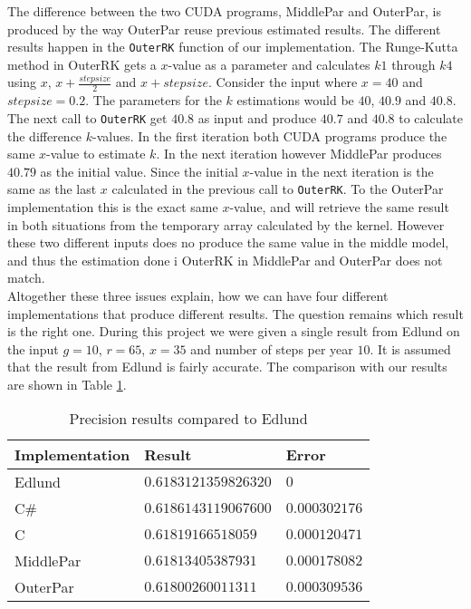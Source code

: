 The difference between the two CUDA programs, MiddlePar and OuterPar, is produced by the way OuterPar reuse previous estimated results. The different results happen in the \texttt{OuterRK} function of our implementation. The Runge-Kutta method in OuterRK gets a $x$-value as a parameter and calculates $k1$ through $k4$ using $x$, $x+\frac{stepsize}{2}$ and $x+stepsize$. Consider the input where $x = 40$ and $stepsize = 0.2$. The parameters for the $k$ estimations would be $40$, $40.9$ and $40.8$. The next call to \texttt{OuterRK} get $40.8$ as input and produce $40.7$ and $40.8$ to calculate the difference $k$-values. In the first iteration both CUDA programs produce the same $x$-value to estimate $k$. In the next iteration however MiddlePar produces $40.79$ as the initial value. Since the initial $x$-value in the next iteration is the same as the last $x$ calculated in the previous call to \texttt{OuterRK}. To the OuterPar implementation this is the exact same $x$-value, and will retrieve the same result in both situations from the temporary array calculated by the kernel. However these two different inputs does no produce the same value in the middle model, and thus the estimation done i OuterRK in MiddlePar and OuterPar does not match.\\

Altogether these three issues explain, how we can have four different implementations that produce different results. The question remains which result is the right one. During this project we were given a single result from Edlund on the input $g=10$, $r=65$, $x=35$ and number of steps per year $10$. It is assumed that the result from Edlund is fairly accurate. The comparison with our results are shown in Table \ref{table:precision}.

\begin{table}
\begin{center}
\begin{tabular}[ht!]{|l|l|l|}
	\hline
\textbf{Implementation}&\textbf{Result}&\textbf{Error}\\\hline
Edlund&$0.6183121359826320$&$0$\\\hline
C\#&$0.6186143119067600$&$0.000302176$\\\hline
C&$0.61819166518059$&$0.000120471$\\\hline
MiddlePar&$0.61813405387931$&$0.000178082$\\\hline
OuterPar&$0.61800260011311$&$0.000309536$\\\hline
\end{tabular}
\end{center}
\caption{Precision results compared to Edlund}
\label{table:precision}
\end{table}

